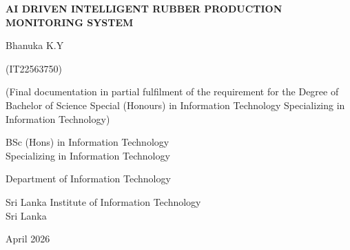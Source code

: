 \thispagestyle{empty}
\begin{center}

\vspace*{2cm}

{\fontsize{16}{24}\selectfont\bfseries
AI DRIVEN INTELLIGENT RUBBER PRODUCTION\\
MONITORING SYSTEM}

\vspace{4cm}

{\fontsize{14}{18}\selectfont
Bhanuka K.Y}

\vspace{0.5cm}

{\fontsize{14}{18}\selectfont
(IT22563750)}

\vspace{1.5cm}

{\fontsize{12}{16}\selectfont
(Final documentation in partial fulfilment of the requirement for the Degree of Bachelor of
Science Special (Honours) in Information Technology Specializing in Information Technology)}

\vspace{1.5cm}

{\fontsize{14}{18}\selectfont
BSc (Hons) in Information Technology\\
Specializing in Information Technology}

\vspace{1.5cm}

{\fontsize{14}{18}\selectfont
Department of Information Technology}

\vspace{0.5cm}

{\fontsize{14}{18}\selectfont
Sri Lanka Institute of Information Technology\\
Sri Lanka}

\vspace{1.5cm}

{\fontsize{14}{18}\selectfont
April 2026}

\end{center}
\newpage
